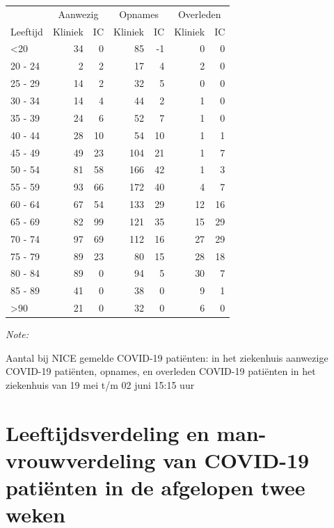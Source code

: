\documentclass[
  english,
  man,floatsintext]{apa6}
\begin{document}
\begin{table}
\centering\begingroup\fontsize{10}{12}\selectfont

\begin{threeparttable}
\begin{tabular}{lrrrrrr}
\toprule
\multicolumn{1}{c}{ } & \multicolumn{2}{c}{Aanwezig} & \multicolumn{2}{c}{Opnames} & \multicolumn{2}{c}{Overleden} \\
\cmidrule(l{3pt}r{3pt}){2-3} \cmidrule(l{3pt}r{3pt}){4-5} \cmidrule(l{3pt}r{3pt}){6-7}
Leeftijd & Kliniek & IC & Kliniek & IC & Kliniek & IC\\
\midrule
<20 & 34 & 0 & 85 & -1 & 0 & 0\\
20 - 24 & 2 & 2 & 17 & 4 & 2 & 0\\
25 - 29 & 14 & 2 & 32 & 5 & 0 & 0\\
30 - 34 & 14 & 4 & 44 & 2 & 1 & 0\\
35 - 39 & 24 & 6 & 52 & 7 & 1 & 0\\
40 - 44 & 28 & 10 & 54 & 10 & 1 & 1\\
45 - 49 & 49 & 23 & 104 & 21 & 1 & 7\\
50 - 54 & 81 & 58 & 166 & 42 & 1 & 3\\
55 - 59 & 93 & 66 & 172 & 40 & 4 & 7\\
60 - 64 & 67 & 54 & 133 & 29 & 12 & 16\\
65 - 69 & 82 & 99 & 121 & 35 & 15 & 29\\
70 - 74 & 97 & 69 & 112 & 16 & 27 & 29\\
75 - 79 & 89 & 23 & 80 & 15 & 28 & 18\\
80 - 84 & 89 & 0 & 94 & 5 & 30 & 7\\
85 - 89 & 41 & 0 & 38 & 0 & 9 & 1\\
>90 & 21 & 0 & 32 & 0 & 6 & 0\\
\bottomrule
\end{tabular}
\begin{tablenotes}
\item \textit{Note: } 
\item Aantal bij NICE gemelde COVID-19 patiënten: in het ziekenhuis aanwezige COVID-19 patiënten, opnames, en overleden COVID-19 patiënten in het ziekenhuis van 19 mei t/m 02 juni 15:15 uur
\end{tablenotes}
\end{threeparttable}
\endgroup{}
\end{table}

\newpage

\hypertarget{leeftijdsverdeling-en-man-vrouwverdeling-van-covid-19-patiuxebnten-in-de-afgelopen-twee-weken}{%
\section{Leeftijdsverdeling en man-vrouwverdeling van COVID-19 patiënten in de afgelopen twee weken}\label{leeftijdsverdeling-en-man-vrouwverdeling-van-covid-19-patiuxebnten-in-de-afgelopen-twee-weken}}
\end{document}
